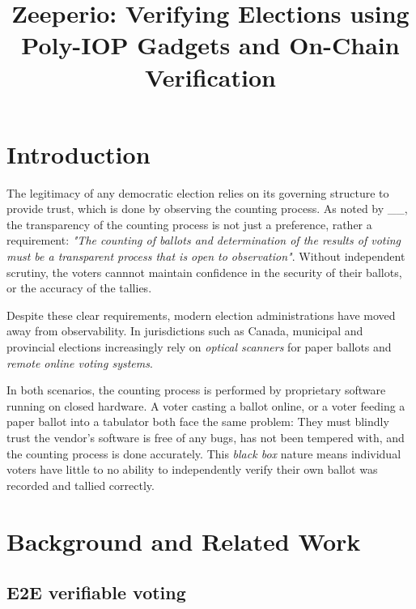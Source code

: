 \documentclass{llncs}
\begin{document}
\title{Zeeperio: Verifying Elections using Poly-IOP Gadgets and On-Chain Verification}




\begin{abstract}
\end{abstract}


\section{Introduction}

The legitimacy of any democratic election relies on its governing structure to provide trust, which is done by observing the counting process. 
As noted by \_\_, the transparency of the counting process is not just a preference, rather a requirement: \emph{"The counting of ballots
and determination of the results of voting must be a transparent process that is open to observation"}. Without independent scrutiny, the voters cannnot maintain confidence in the security of their ballots, or the accuracy of the tallies.

Despite these clear requirements, modern election administrations have moved away from observability. 
In jurisdictions such as Canada, municipal and provincial elections increasingly rely on \emph{optical scanners} for paper ballots and \emph{remote online voting systems}. 

In both scenarios, the counting process is performed by proprietary software running on closed hardware. 
A voter casting a ballot online, or a voter feeding a paper ballot into a tabulator both face the same problem: 
They must blindly trust the vendor's software is free of any bugs, has not been tempered with, and the counting process is done accurately.
This \emph{black box} nature means individual voters have little to no ability to independently verify their own ballot was recorded and tallied correctly.


\section{Background and Related Work}

\subsection{E2E verifiable voting}
\end{document}
